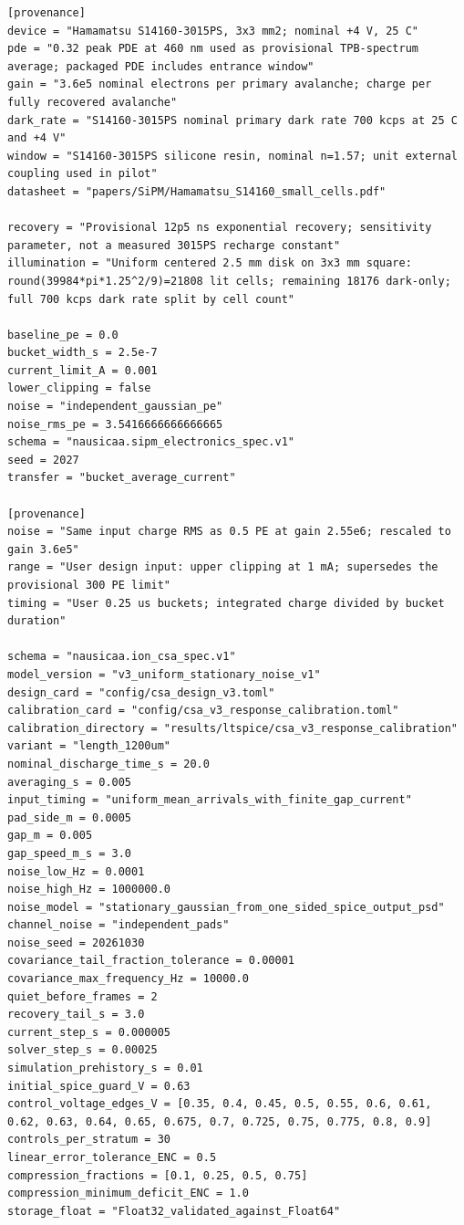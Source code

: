 \documentclass[11pt,a4paper]{article}
\begin{document}
\begin{Verbatim}[breaklines,breakanywhere,fontsize=\footnotesize]
[provenance]
device = "Hamamatsu S14160-3015PS, 3x3 mm2; nominal +4 V, 25 C"
pde = "0.32 peak PDE at 460 nm used as provisional TPB-spectrum average; packaged PDE includes entrance window"
gain = "3.6e5 nominal electrons per primary avalanche; charge per fully recovered avalanche"
dark_rate = "S14160-3015PS nominal primary dark rate 700 kcps at 25 C and +4 V"
window = "S14160-3015PS silicone resin, nominal n=1.57; unit external coupling used in pilot"
datasheet = "papers/SiPM/Hamamatsu_S14160_small_cells.pdf"

recovery = "Provisional 12p5 ns exponential recovery; sensitivity parameter, not a measured 3015PS recharge constant"
illumination = "Uniform centered 2.5 mm disk on 3x3 mm square: round(39984*pi*1.25^2/9)=21808 lit cells; remaining 18176 dark-only; full 700 kcps dark rate split by cell count"

baseline_pe = 0.0
bucket_width_s = 2.5e-7
current_limit_A = 0.001
lower_clipping = false
noise = "independent_gaussian_pe"
noise_rms_pe = 3.5416666666666665
schema = "nausicaa.sipm_electronics_spec.v1"
seed = 2027
transfer = "bucket_average_current"

[provenance]
noise = "Same input charge RMS as 0.5 PE at gain 2.55e6; rescaled to gain 3.6e5"
range = "User design input: upper clipping at 1 mA; supersedes the provisional 300 PE limit"
timing = "User 0.25 us buckets; integrated charge divided by bucket duration"

schema = "nausicaa.ion_csa_spec.v1"
model_version = "v3_uniform_stationary_noise_v1"
design_card = "config/csa_design_v3.toml"
calibration_card = "config/csa_v3_response_calibration.toml"
calibration_directory = "results/ltspice/csa_v3_response_calibration"
variant = "length_1200um"
nominal_discharge_time_s = 20.0
averaging_s = 0.005
input_timing = "uniform_mean_arrivals_with_finite_gap_current"
pad_side_m = 0.0005
gap_m = 0.005
gap_speed_m_s = 3.0
noise_low_Hz = 0.0001
noise_high_Hz = 1000000.0
noise_model = "stationary_gaussian_from_one_sided_spice_output_psd"
channel_noise = "independent_pads"
noise_seed = 20261030
covariance_tail_fraction_tolerance = 0.00001
covariance_max_frequency_Hz = 10000.0
quiet_before_frames = 2
recovery_tail_s = 3.0
current_step_s = 0.000005
solver_step_s = 0.00025
simulation_prehistory_s = 0.01
initial_spice_guard_V = 0.63
control_voltage_edges_V = [0.35, 0.4, 0.45, 0.5, 0.55, 0.6, 0.61, 0.62, 0.63, 0.64, 0.65, 0.675, 0.7, 0.725, 0.75, 0.775, 0.8, 0.9]
controls_per_stratum = 30
linear_error_tolerance_ENC = 0.5
compression_fractions = [0.1, 0.25, 0.5, 0.75]
compression_minimum_deficit_ENC = 1.0
storage_float = "Float32_validated_against_Float64"


\end{Verbatim}
\end{document}
